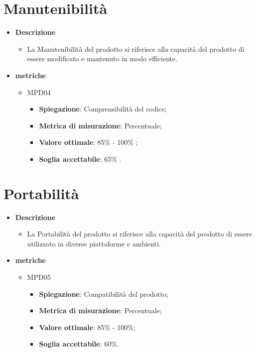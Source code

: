 \section{Manutenibilità}
\begin{itemize}
    \item \textbf{Descrizione}
    \begin{itemize}
        \item La Manutenibilità del prodotto si riferisce alla capacità del prodotto di essere modificato e mantenuto in modo efficiente.
    \end{itemize}
    
    \item \textbf{metriche}
    \begin{itemize}
        \item MPD04
        \begin{itemize}
            \item \textbf{Spiegazione}: Comprensibilità del codice;
        \item \textbf{Metrica di misurazione}: Percentuale;
        \item \textbf{Valore ottimale}: 85\% - 100\% ;
        \item \textbf{Soglia accettabile}: 65\% .
        \end{itemize}
    \end{itemize}
    \end{itemize}


\section{Portabilità}
\begin{itemize}
    \item \textbf{Descrizione}
    \begin{itemize}
        \item La Portabilità del prodotto si riferisce alla capacità del prodotto di essere utilizzato in diverse piattaforme e ambienti.
    \end{itemize}
    
    \item \textbf{metriche}
    \begin{itemize}
        \item MPD05
        \begin{itemize}
            \item \textbf{Spiegazione}: Compatibilità del prodotto;
        \item \textbf{Metrica di misurazione}: Percentuale;
        \item \textbf{Valore ottimale}: 85\% - 100\%;
        \item \textbf{Soglia accettabile}: 60\%.
        \end{itemize}
    \end{itemize}
    \end{itemize}



